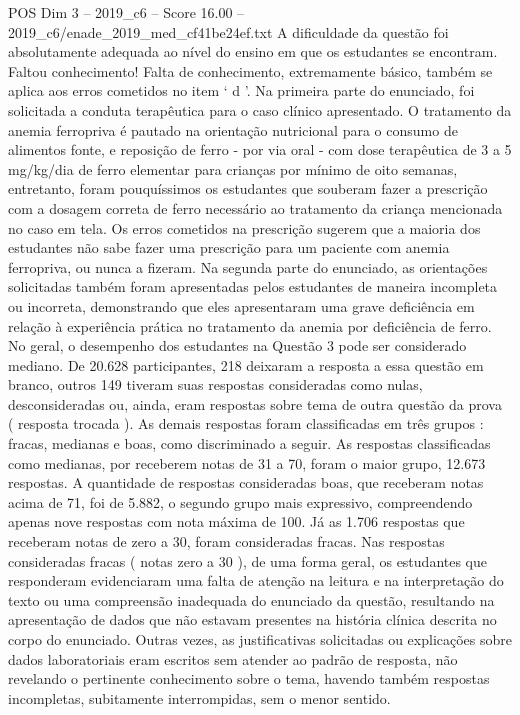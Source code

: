 \begin{textsample}{POS Dim 3 – 2019\_c6 – Score 16.00 – 2019\_c6/enade\_2019\_med\_cf41be24ef.txt}
A dificuldade da questão foi absolutamente adequada ao nível do ensino em que os estudantes se encontram.
Faltou conhecimento!
Falta de conhecimento, extremamente básico, também se aplica aos erros cometidos no item ‘ d ’.
Na primeira parte do enunciado, foi solicitada a conduta terapêutica para o caso clínico apresentado.
O tratamento da anemia ferropriva é pautado na orientação nutricional para o consumo de alimentos fonte, e reposição de ferro - por via oral - com dose terapêutica de 3 a 5 mg/kg/dia de ferro elementar para crianças por mínimo de oito semanas, entretanto, foram pouquíssimos os estudantes que souberam fazer a prescrição com a dosagem correta de ferro necessário ao tratamento da criança mencionada no caso em tela.
Os erros cometidos na prescrição sugerem que a maioria dos estudantes não sabe fazer uma prescrição para um paciente com anemia ferropriva, ou nunca a fizeram.
Na segunda parte do enunciado, as orientações solicitadas também foram apresentadas pelos estudantes de maneira incompleta ou incorreta, demonstrando que eles apresentaram uma grave deficiência em relação à experiência prática no tratamento da anemia por deficiência de ferro.
No geral, o desempenho dos estudantes na Questão 3 pode ser considerado mediano.
De 20.628 participantes, 218 deixaram a resposta a essa questão em branco, outros 149 tiveram suas respostas consideradas como nulas, desconsideradas ou, ainda, eram respostas sobre tema de outra questão da prova ( resposta trocada ).
As demais respostas foram classificadas em três grupos : fracas, medianas e boas, como discriminado a seguir.
As respostas classificadas como medianas, por receberem notas de 31 a 70, foram o maior grupo, 12.673 respostas.
A quantidade de respostas consideradas boas, que receberam notas acima de 71, foi de 5.882, o segundo grupo mais expressivo, compreendendo apenas nove respostas com nota máxima de 100.
Já as 1.706 respostas que receberam notas de zero a 30, foram consideradas fracas.
Nas respostas consideradas fracas ( notas zero a 30 ), de uma forma geral, os estudantes que responderam evidenciaram uma falta de atenção na leitura e na interpretação do texto ou uma compreensão inadequada do enunciado da questão, resultando na apresentação de dados que não estavam presentes na história clínica descrita no corpo do enunciado.
Outras vezes, as justificativas solicitadas ou explicações sobre dados laboratoriais eram escritos sem atender ao padrão de resposta, não revelando o pertinente conhecimento sobre o tema, havendo também respostas incompletas, subitamente interrompidas, sem o menor sentido.

\end{textsample}
